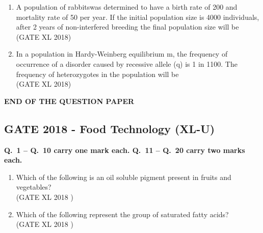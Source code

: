 \documentclass[14pt]{extarticle}
\begin{document}
\begin{flushleft}
\begin{enumerate}
\item A population of rabbitswas determined to have a birth rate of 200 and mortality rate of 50 per year. If the initial population size is 4000 individuals, after 2 years of non-interfered breeding the final population size will be \underline{\hspace{3cm}} 
\hfill(GATE XL 2018)\\

\item In a population in Hardy-Weinberg equilibrium m, the frequency of occurrence of a disorder caused by recessive allele (q) is 1 in 1100. The frequency of heterozygotes in the population will be  \underline{\hspace{3cm}} \\
\hfill(GATE XL 2018)

\end{enumerate}
\begin{center}
    \textbf{END OF THE QUESTION PAPER}
\end{center}
\clearpage


\begin{center}
 \section*{GATE 2018 - Food Technology (XL-U)}
 \end{center}
 
\textbf{Q.~1 -- Q.~10 carry one mark each. Q.~11 -- Q.~20 carry two marks each.}\\

\begin{enumerate}
\item Which of the following is an oil soluble pigment present in fruits and vegetables?\\
\hfill(GATE XL 2018 )\\
\begin{enumerate}
\end{enumerate}

\item Which of the following represent the group of saturated fatty acids?\\
\hfill(GATE XL 2018 )\\
\begin{enumerate}
\end{enumerate}


\end{enumerate}
\end{flushleft}
\end{document}
